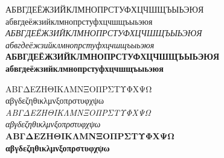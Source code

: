 \documentclass[10pt, twoside]{lecturenotes}
\begin{document}
\begin{sloppypar}
\begin{figure}[ht]
{\begin{minipage}[b]{0.45\linewidth}
\noindent
\textsf{%
АБВГДЕЁЖЗИЙКЛМНОПРСТУФХЦЧШЩЪЫЬЭЮЯ \\
абвгдеёжзийклмнопрстуфхцчшщъыьэюя \\
\textit{АБВГДЕЁЖЗИЙКЛМНОПРСТУФХЦЧШЩЪЫЬЭЮЯ\\
абвгдеёжзийклмнопрстуфхцчшщъыьэюя }\\
\textbf{АБВГДЕЁЖЗИЙКЛМНОПРСТУФХЦЧШЩЪЫЬЭЮЯ \\
абвгдеёжзийклмнопрстуфхцчшщъыьэюя }\\
}

\noindent
\textsf{%
ΑΒΓΔΕΖΗΘΙΚΛΜΝΞΟΠΡΣΤΥΦΧΨΩ\\
αβγδεζηθικλμνξοπρστυφχψω\\
\textit{ΑΒΓΔΕΖΗΘΙΚΛΜΝΞΟΠΡΣΤΥΦΧΨΩ\\
αβγδεζηθικλμνξοπρστυφχψω}\\
\textbf{ΑΒΓΔΕΖΗΘΙΚΛΜΝΞΟΠΡΣΤΥΦΧΨΩ\\
αβγδεζηθικλμνξοπρστυφχψω}\\
}


\end{minipage}
}
\end{figure}

\newpage


\end{sloppypar}
\end{document}
